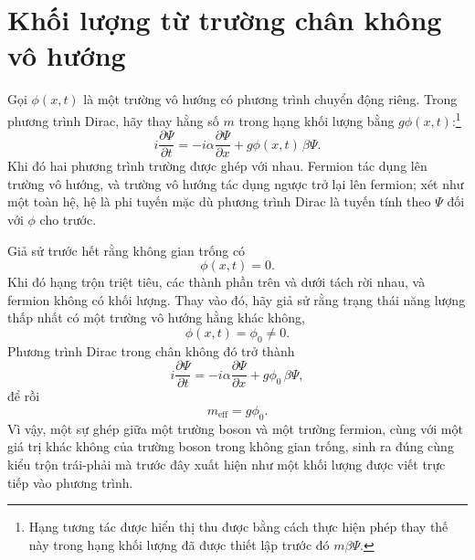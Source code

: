 \begin{classroomqa}
\end{classroomqa}

\section{Khối lượng từ trường chân không vô hướng}

\begin{classroomqa}
\end{classroomqa}

Gọi \(\phi(x,t)\) là một trường vô hướng có phương trình chuyển động riêng. Trong phương trình Dirac, hãy thay hằng số \(m\) trong hạng khối lượng bằng \(g\phi(x,t)\):\footnote{Hạng tương tác được hiển thị thu được bằng cách thực hiện phép thay thế này trong hạng khối lượng đã được thiết lập trước đó \(m\beta\Psi\).}
\begin{equation}
i\frac{\partial\Psi}{\partial t}
=
-i\alpha\frac{\partial\Psi}{\partial x}
+g\phi(x,t)\,\beta\Psi.
\end{equation}
Khi đó hai phương trình trường được ghép với nhau. Fermion tác dụng lên trường vô hướng, và trường vô hướng tác dụng ngược trở lại lên fermion; xét như một toàn hệ, hệ là phi tuyến mặc dù phương trình Dirac là tuyến tính theo \(\Psi\) đối với \(\phi\) cho trước.

Giả sử trước hết rằng không gian trống có
\begin{equation}
\phi(x,t)=0.
\end{equation}
Khi đó hạng trộn triệt tiêu, các thành phần trên và dưới tách rời nhau, và fermion không có khối lượng. Thay vào đó, hãy giả sử rằng trạng thái năng lượng thấp nhất có một trường vô hướng hằng khác không,
\begin{equation}
\phi(x,t)=\phi_0\neq0.
\end{equation}
Phương trình Dirac trong chân không đó trở thành
\begin{equation}
i\frac{\partial\Psi}{\partial t}
=
-i\alpha\frac{\partial\Psi}{\partial x}
+g\phi_0\,\beta\Psi,
\end{equation}
để rồi
\begin{equation}
m_{\mathrm{eff}}=g\phi_0.
\end{equation}
Vì vậy, một sự ghép giữa một trường boson và một trường fermion, cùng với một giá trị khác không của trường boson trong không gian trống, sinh ra đúng cùng kiểu trộn trái-phải mà trước đây xuất hiện như một khối lượng được viết trực tiếp vào phương trình.

